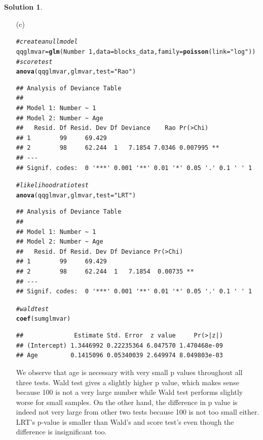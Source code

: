 \documentclass[11pt,letterpaper,english,oneside]{article}\usepackage[]{graphicx}\usepackage[]{color}
\makeatletter
\newcommand{\hlnum}[1]{\textcolor[rgb]{0.686,0.059,0.569}{#1}}%
\newcommand{\hlstr}[1]{\textcolor[rgb]{0.192,0.494,0.8}{#1}}%
\newcommand{\hlcom}[1]{\textcolor[rgb]{0.678,0.584,0.686}{\textit{#1}}}%
\newcommand{\hlopt}[1]{\textcolor[rgb]{0,0,0}{#1}}%
\newcommand{\hlstd}[1]{\textcolor[rgb]{0.345,0.345,0.345}{#1}}%
\newcommand{\hlkwb}[1]{\textcolor[rgb]{0.69,0.353,0.396}{#1}}%
\newcommand{\hlkwc}[1]{\textcolor[rgb]{0.333,0.667,0.333}{#1}}%
\newcommand{\hlkwd}[1]{\textcolor[rgb]{0.737,0.353,0.396}{\textbf{#1}}}%
\newenvironment{kframe}{%
 \def\at@end@of@kframe{}%
 \ifinner\ifhmode%
  \def\at@end@of@kframe{\end{minipage}}%
  \begin{minipage}{\columnwidth}%
 \fi\fi%
 \def\FrameCommand##1{\hskip\@totalleftmargin \hskip-\fboxsep
 \colorbox{shadecolor}{##1}\hskip-\fboxsep
     \hskip-\linewidth \hskip-\@totalleftmargin \hskip\columnwidth}%
 \MakeFramed {\advance\hsize-\width
   \@totalleftmargin\z@ \linewidth\hsize
   \@setminipage}}%
 {\par\unskip\endMakeFramed%
 \at@end@of@kframe}
\newenvironment{knitrout}{}{} %
\theoremstyle{definition} %
\newtheorem{solution}{Solution}
\newenvironment{sol}{\begin{solution}\hspace{0pt}}{\end{solution}}
\makeatother
\begin{document}
\begin{sol}
\begin{enumerate}
\item[(c)]
\begin{knitrout}
\color{fgcolor}\begin{kframe}
\begin{alltt}
\hlcom{#create a null model}
\hlstd{qqglmvar} \hlkwb{=} \hlkwd{glm}\hlstd{(Number}\hlopt{~}\hlnum{1}\hlstd{,} \hlkwc{data} \hlstd{= blocks_data,} \hlkwc{family} \hlstd{=} \hlkwd{poisson}\hlstd{(}\hlkwc{link} \hlstd{=} \hlstr{"log"}\hlstd{))}
\hlcom{#score test}
\hlkwd{anova}\hlstd{(qqglmvar,glmvar,}\hlkwc{test}\hlstd{=}\hlstr{"Rao"}\hlstd{)}
\end{alltt}
\begin{verbatim}
## Analysis of Deviance Table
## 
## Model 1: Number ~ 1
## Model 2: Number ~ Age
##   Resid. Df Resid. Dev Df Deviance    Rao Pr(>Chi)   
## 1        99     69.429                               
## 2        98     62.244  1   7.1854 7.0346 0.007995 **
## ---
## Signif. codes:  0 '***' 0.001 '**' 0.01 '*' 0.05 '.' 0.1 ' ' 1
\end{verbatim}
\begin{alltt}
\hlcom{#likelihood ratio test}
\hlkwd{anova}\hlstd{(qqglmvar,glmvar,}\hlkwc{test}\hlstd{=}\hlstr{"LRT"}\hlstd{)}
\end{alltt}
\begin{verbatim}
## Analysis of Deviance Table
## 
## Model 1: Number ~ 1
## Model 2: Number ~ Age
##   Resid. Df Resid. Dev Df Deviance Pr(>Chi)   
## 1        99     69.429                        
## 2        98     62.244  1   7.1854  0.00735 **
## ---
## Signif. codes:  0 '***' 0.001 '**' 0.01 '*' 0.05 '.' 0.1 ' ' 1
\end{verbatim}
\begin{alltt}
\hlcom{#wald test}
\hlkwd{coef}\hlstd{(sumglmvar)}
\end{alltt}
\begin{verbatim}
##              Estimate Std. Error  z value     Pr(>|z|)
## (Intercept) 1.3446992 0.22235364 6.047570 1.470468e-09
## Age         0.1415096 0.05340039 2.649974 8.049803e-03
\end{verbatim}
\end{kframe}
\end{knitrout}

We observe that age is necessary with very small p values throughout all three tests. Wald test gives a slightly higher p value, which makes sense because 100 is not a very large number while Wald test performs slightly worse for small samples. On the other hand, the difference in p value is indeed not very large from other two tests because 100 is not too small either. LRT's p-value is smaller than Wald's and score test's even though the difference is insignificant too. 



\end{enumerate}
\end{sol}
\end{document}
